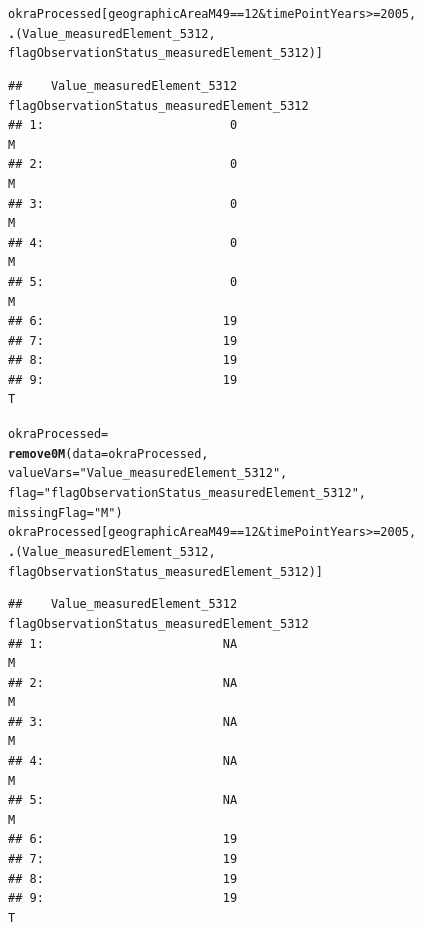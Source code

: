 \documentclass[nojss]{jss}\usepackage[]{graphicx}\usepackage[]{color}
\makeatletter
\newcommand{\hlnum}[1]{\textcolor[rgb]{0.686,0.059,0.569}{#1}}%
\newcommand{\hlstr}[1]{\textcolor[rgb]{0.192,0.494,0.8}{#1}}%
\newcommand{\hlopt}[1]{\textcolor[rgb]{0,0,0}{#1}}%
\newcommand{\hlstd}[1]{\textcolor[rgb]{0.345,0.345,0.345}{#1}}%
\newcommand{\hlkwb}[1]{\textcolor[rgb]{0.69,0.353,0.396}{#1}}%
\newcommand{\hlkwc}[1]{\textcolor[rgb]{0.333,0.667,0.333}{#1}}%
\newcommand{\hlkwd}[1]{\textcolor[rgb]{0.737,0.353,0.396}{\textbf{#1}}}%
\newenvironment{kframe}{%
 \def\at@end@of@kframe{}%
 \ifinner\ifhmode%
  \def\at@end@of@kframe{\end{minipage}}%
  \begin{minipage}{\columnwidth}%
 \fi\fi%
 \def\FrameCommand##1{\hskip\@totalleftmargin \hskip-\fboxsep
 \colorbox{shadecolor}{##1}\hskip-\fboxsep
     \hskip-\linewidth \hskip-\@totalleftmargin \hskip\columnwidth}%
 \MakeFramed {\advance\hsize-\width
   \@totalleftmargin\z@ \linewidth\hsize
   \@setminipage}}%
 {\par\unskip\endMakeFramed%
 \at@end@of@kframe}
\newenvironment{knitrout}{}{} %
\makeatother
\begin{document}
\begin{knitrout}
\color{fgcolor}\begin{kframe}
\begin{alltt}
\hlstd{okraProcessed[geographicAreaM49} \hlopt{==} \hlnum{12} \hlopt{&} \hlstd{timePointYears} \hlopt{>=} \hlnum{2005}\hlstd{,}
              \hlkwd{.}\hlstd{(Value_measuredElement_5312,}
                \hlstd{flagObservationStatus_measuredElement_5312)]}
\end{alltt}
\begin{verbatim}
##    Value_measuredElement_5312 flagObservationStatus_measuredElement_5312
## 1:                          0                                          M
## 2:                          0                                          M
## 3:                          0                                          M
## 4:                          0                                          M
## 5:                          0                                          M
## 6:                         19                                           
## 7:                         19                                           
## 8:                         19                                           
## 9:                         19                                          T
\end{verbatim}
\begin{alltt}
\hlstd{okraProcessed} \hlkwb{=}
    \hlkwd{remove0M}\hlstd{(}\hlkwc{data} \hlstd{= okraProcessed,}
             \hlkwc{valueVars} \hlstd{=} \hlstr{"Value_measuredElement_5312"}\hlstd{,}
             \hlkwc{flag} \hlstd{=} \hlstr{"flagObservationStatus_measuredElement_5312"}\hlstd{,}
             \hlkwc{missingFlag} \hlstd{=} \hlstr{"M"}\hlstd{)}
\hlstd{okraProcessed[geographicAreaM49} \hlopt{==} \hlnum{12} \hlopt{&} \hlstd{timePointYears} \hlopt{>=} \hlnum{2005}\hlstd{,}
              \hlkwd{.}\hlstd{(Value_measuredElement_5312,}
                \hlstd{flagObservationStatus_measuredElement_5312)]}
\end{alltt}
\begin{verbatim}
##    Value_measuredElement_5312 flagObservationStatus_measuredElement_5312
## 1:                         NA                                          M
## 2:                         NA                                          M
## 3:                         NA                                          M
## 4:                         NA                                          M
## 5:                         NA                                          M
## 6:                         19                                           
## 7:                         19                                           
## 8:                         19                                           
## 9:                         19                                          T
\end{verbatim}
\end{kframe}
\end{knitrout}
\end{document}
